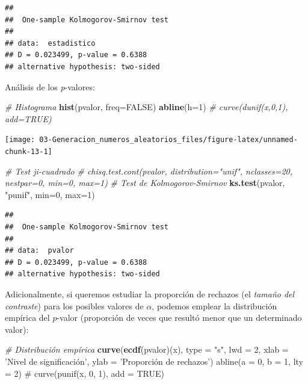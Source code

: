 \documentclass[
]{book}
\newenvironment{Shaded}{\begin{snugshade}}{\end{snugshade}}
\newcommand{\CommentTok}[1]{\textcolor[rgb]{0.56,0.35,0.01}{\textit{#1}}}
\newcommand{\DataTypeTok}[1]{\textcolor[rgb]{0.13,0.29,0.53}{#1}}
\newcommand{\DecValTok}[1]{\textcolor[rgb]{0.00,0.00,0.81}{#1}}
\newcommand{\KeywordTok}[1]{\textcolor[rgb]{0.13,0.29,0.53}{\textbf{#1}}}
\newcommand{\NormalTok}[1]{#1}
\newcommand{\OtherTok}[1]{\textcolor[rgb]{0.56,0.35,0.01}{#1}}
\newcommand{\StringTok}[1]{\textcolor[rgb]{0.31,0.60,0.02}{#1}}
\theoremstyle{break}
\theoremstyle{definition}
\theoremstyle{definition}
\theoremstyle{definition}
\theoremstyle{remark}
\begin{document}
\begin{verbatim}
## 
##  One-sample Kolmogorov-Smirnov test
## 
## data:  estadistico
## D = 0.023499, p-value = 0.6388
## alternative hypothesis: two-sided
\end{verbatim}

Análisis de los \emph{p}-valores:

\begin{Shaded}
\begin{Highlighting}[]
\CommentTok{# Histograma}
\KeywordTok{hist}\NormalTok{(pvalor, }\DataTypeTok{freq=}\OtherTok{FALSE}\NormalTok{)}
\KeywordTok{abline}\NormalTok{(}\DataTypeTok{h=}\DecValTok{1}\NormalTok{) }\CommentTok{# curve(dunif(x,0,1), add=TRUE)}
\end{Highlighting}
\end{Shaded}

\begin{center}\texttt{[image: 03-Generacion\_numeros\_aleatorios\_files/figure-latex/unnamed-chunk-13-1]} \end{center}

\begin{Shaded}
\begin{Highlighting}[]
\CommentTok{# Test ji-cuadrado}
\CommentTok{# chisq.test.cont(pvalor, distribution="unif", nclasses=20, nestpar=0, min=0, max=1)}
\CommentTok{# Test de Kolmogorov-Smirnov}
\KeywordTok{ks.test}\NormalTok{(pvalor, }\StringTok{"punif"}\NormalTok{,  }\DataTypeTok{min=}\DecValTok{0}\NormalTok{, }\DataTypeTok{max=}\DecValTok{1}\NormalTok{)}
\end{Highlighting}
\end{Shaded}

\begin{verbatim}
## 
##  One-sample Kolmogorov-Smirnov test
## 
## data:  pvalor
## D = 0.023499, p-value = 0.6388
## alternative hypothesis: two-sided
\end{verbatim}

Adicionalmente, si queremos estudiar la proporción de rechazos (el \emph{tamaño del contraste}) para los posibles valores de \(\alpha\), podemos emplear la distribución empírica del \(p\)-valor (proporción de veces que resultó menor que un determinado valor):

\begin{Shaded}
\begin{Highlighting}[]
\CommentTok{# Distribución empírica}
\KeywordTok{curve}\NormalTok{(}\KeywordTok{ecdf}\NormalTok{(pvalor)(x), }\DataTypeTok{type =} \StringTok{"s"}\NormalTok{, }\DataTypeTok{lwd =} \DecValTok{2}\NormalTok{, }
      \DataTypeTok{xlab =} \StringTok{'Nivel de significación', ylab = '}\NormalTok{Proporción de rechazos}\StringTok{')}
\StringTok{abline(a = 0, b = 1, lty = 2)   # curve(punif(x, 0, 1), add = TRUE)}
\end{Highlighting}
\end{Shaded}
\end{document}

